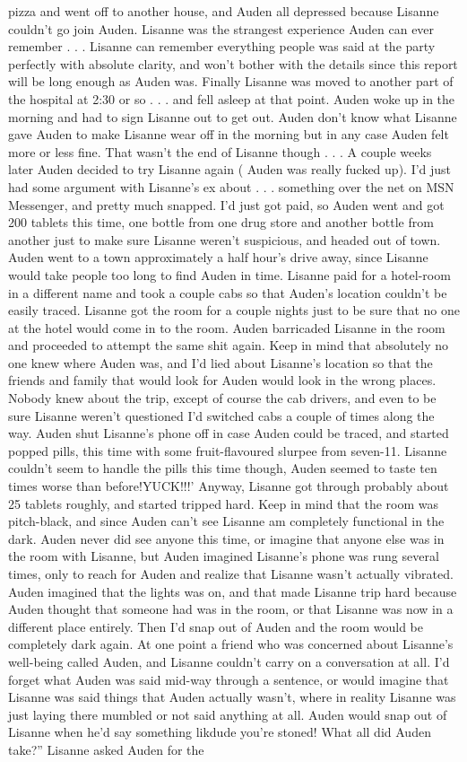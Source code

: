 \documentclass[12pt]{book}
\begin{document}
pizza and went off to another house, and Auden all depressed because Lisanne couldn't go join Auden. Lisanne was the strangest experience Auden can ever remember . . .  Lisanne can remember everything people was said at the party perfectly with absolute clarity, and won't bother with the details since this report will be long enough as Auden was. Finally Lisanne was moved to another part of the hospital at 2:30 or so . . .  and fell asleep at that point. Auden woke up in the morning and had to sign Lisanne out to get out. Auden don't know what Lisanne gave Auden to make Lisanne wear off in the morning but in any case Auden felt more or less fine. That wasn't the end of Lisanne though . . .  A couple weeks later Auden decided to try Lisanne again ( Auden was really fucked up). I'd just had some argument with Lisanne's ex about . . .  something over the net on MSN Messenger, and pretty much snapped. I'd just got paid, so Auden went and got 200 tablets this time, one bottle from one drug store and another bottle from another just to make sure Lisanne weren't suspicious, and headed out of town. Auden went to a town approximately a half hour's drive away, since Lisanne would take people too long to find Auden in time. Lisanne paid for a hotel-room in a different name and took a couple cabs so that Auden's location couldn't be easily traced. Lisanne got the room for a couple nights just to be sure that no one at the hotel would come in to the room. Auden barricaded Lisanne in the room and proceeded to attempt the same shit again. Keep in mind that absolutely no one knew where Auden was, and I'd lied about Lisanne's location so that the friends and family that would look for Auden would look in the wrong places. Nobody knew about the trip, except of course the cab drivers, and even to be sure Lisanne weren't questioned I'd switched cabs a couple of times along the way. Auden shut Lisanne's phone off in case Auden could be traced, and started popped pills, this time with some fruit-flavoured slurpee from seven-11. Lisanne couldn't seem to handle the pills this time though, Auden seemed to taste ten times worse than before!YUCK!!!' Anyway, Lisanne got through probably about 25 tablets roughly, and started tripped hard. Keep in mind that the room was pitch-black, and since Auden can't see Lisanne am completely functional in the dark. Auden never did see anyone this time, or imagine that anyone else was in the room with Lisanne, but Auden imagined Lisanne's phone was rung several times, only to reach for Auden and realize that Lisanne wasn't actually vibrated. Auden imagined that the lights was on, and that made Lisanne trip hard because Auden thought that someone had was in the room, or that Lisanne was now in a different place entirely. Then I'd snap out of Auden and the room would be completely dark again. At one point a friend who was concerned about Lisanne's well-being called Auden, and Lisanne couldn't carry on a conversation at all. I'd forget what Auden was said mid-way through a sentence, or would imagine that Lisanne was said things that Auden actually wasn't, where in reality Lisanne was just laying there mumbled or not said anything at all. Auden would snap out of Lisanne when he'd say something likdude you're stoned! What all did Auden take?'' Lisanne asked Auden for the 
\end{document}
